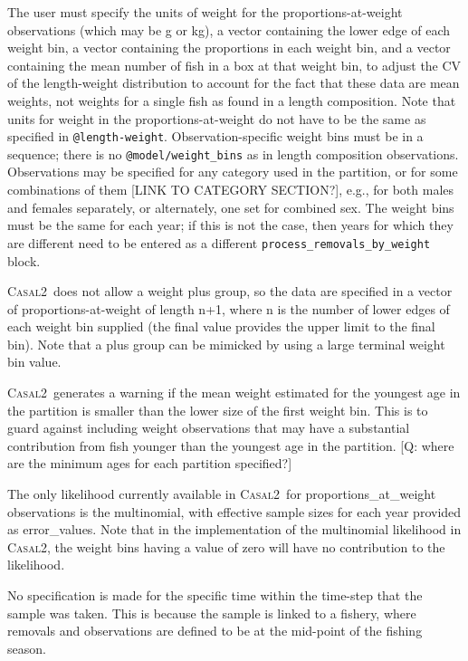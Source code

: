 \documentclass[a4paper,11pt,twoside,pdftex,draft]{article}
\newcommand{\CNAME}{\textsc{Casal2}}
\begin{document}
The user must specify the units of weight for the proportions-at-weight observations (which may be g or kg), a vector containing the lower edge of each weight bin, a vector containing the proportions in each weight bin, and a vector containing the mean number of fish in a box at that weight bin, to adjust the CV of the length-weight distribution to account for the fact that these data are mean weights, not weights for a single fish as found in a length composition. Note that units for weight in the proportions-at-weight do not have to be the same as specified in \texttt{@length-weight}. Observation-specific weight bins must be in a sequence; there is no \texttt{@model/weight\_bins} as in length composition observations. Observations may be specified for any category used in the partition, or for some combinations of them [LINK TO CATEGORY SECTION?], e.g., for both males and females separately, or alternately, one set for combined sex. The weight bins must be the same for each year; if this is not the case, then years for which they are different need to be entered as a different \texttt{process\_removals\_by\_weight} block.

\CNAME~does not allow a weight plus group, so the data are specified in a vector of proportions-at-weight of length n+1, where n is the number of lower edges of each weight bin supplied (the final value provides the upper limit to the final bin). Note that a plus group can be mimicked by using a large terminal weight bin value.

\CNAME~generates a warning if the mean weight estimated for the youngest age in the partition is smaller than the lower size of the first weight bin. This is to guard against including weight observations that may have a substantial contribution from fish younger than the youngest age in the partition. [Q: where are the minimum ages for each partition specified?]

The only likelihood currently available in \CNAME~for proportions\_at\_weight observations is the multinomial, with effective sample sizes for each year provided as error\_values. Note that in the implementation of the multinomial likelihood in \CNAME, the weight bins having a value of zero will have no contribution to the likelihood.

No specification is made for the specific time within the time-step that the sample was taken. This is because the sample is linked to a fishery, where removals and observations are defined to be at the mid-point of the fishing season.
\end{document}
